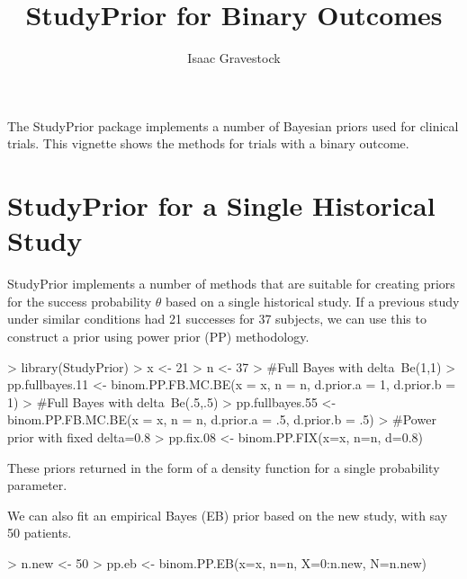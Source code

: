 \documentclass{article}
\begin{document}
\author{Isaac Gravestock}
\title{StudyPrior for Binary Outcomes}
\maketitle

The StudyPrior package implements a number of Bayesian priors used for clinical trials. 
This vignette shows the methods for trials with a binary outcome.

\section{StudyPrior for a Single Historical Study}

StudyPrior implements a number of methods that are suitable for creating priors for the success probability $\theta$ based on a single historical study. 
If a previous study under similar conditions had 21 successes for 37 subjects, we can use this to construct a prior using power prior (PP) methodology.
\begin{Schunk}
\begin{Sinput}
> library(StudyPrior)
> x <- 21
> n <- 37
> #Full Bayes with delta~Be(1,1)
> pp.fullbayes.11 <- binom.PP.FB.MC.BE(x = x, n = n, d.prior.a = 1, d.prior.b = 1) 
> #Full Bayes with delta~Be(.5,.5)
> pp.fullbayes.55 <- binom.PP.FB.MC.BE(x = x, n = n, d.prior.a = .5, d.prior.b = .5) 
> #Power prior with fixed delta=0.8
> pp.fix.08 <- binom.PP.FIX(x=x, n=n, d=0.8) 
\end{Sinput}
\end{Schunk}

These priors returned in the form of a density function for a single probability parameter. 

We can also fit an empirical Bayes (EB) prior based on the new study, with say 50 patients.
\begin{Schunk}
\begin{Sinput}
> n.new <- 50
> pp.eb <- binom.PP.EB(x=x, n=n, X=0:n.new, N=n.new)
\end{Sinput}
\end{Schunk}
\end{document}
